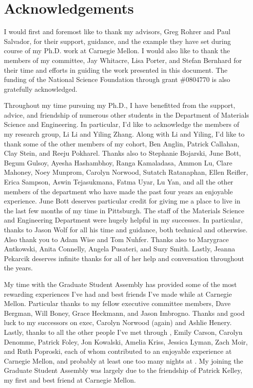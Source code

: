 \chapter{Acknowledgements}


I would first and foremost like to thank my advisors, Greg Rohrer and Paul Salvador, for
their support, guidance, and the example they have set during course of my Ph.D. work at
Carnegie Mellon. I would also like to thank the members of my committee, Jay Whitacre,
Lisa Porter, and Stefan Bernhard for their time and efforts in guiding the work presented
in this document. The funding of the National Science Foundation through grant
\#0804770 is also gratefully acknowledged.

Throughout my time pursuing my Ph.D., I have benefitted from the support, advice, and
friendship of numerous other students in the Department of Materials Science and
Engineering. In particular, I'd like to acknowledge the members of my research group, Li
Li and Yiling Zhang. Along with Li and Yiling, I'd like to thank some of the other members of my
cohort, Ben Anglin, Patrick Callahan, Clay Stein, and Reeju Pokharel. Thanks also to
Stephanie Bojarski, June Bott, Begum Gulsoy, Ayesha Hashambhoy, Ranga Kamaladasa, Ammon
Lu, Clare Mahoney, Noey Munprom, Carolyn Norwood, Sutatch Ratanaphan, Ellen Reifler, Erica
Sampson, Aswin Tejasukmana, Fatma Uyar, Lu Yan, and all the other members of the department who have made the
past four years an enjoyable experience. June Bott deserves particular credit for giving
me a place to live in the last few months of my time in Pittsburgh. The staff of the
Materials Science and Engineering Department were hugely helpful in my successes. In
particular, thanks to Jason Wolf for all his time and guidance, both technical and
otherwise. Also thank you to Adam Wise and Tom Nuhfer. Thanks also to Marygrace Antkowski,
 Anita Connelly, Angela Pusateri, and Suzy Smith. Lastly, Jeanna Pekarcik deserves
infinite thanks for all of her help and conversation throughout the years.

My time with the Graduate Student Assembly has provided some of the most rewarding
experiences I've had and best friends I've made while at Carnegie Mellon. Particular
thanks to my fellow  executive committee members, Dave Bergman, Will Boney,
Grace Heckmann, and Jason Imbrogno. Thanks and good luck to my successors on 
exec, Carolyn Norwood (again) and Ashlie Henery. Lastly, thanks to all the other people
I've met through , Emily Carson, Carolyn Denomme, Patrick Foley, Jon Kowalski,
Amelia Kriss, Jessica Lyman, Zach Moir, and Ruth Poproski, each of whom contributed to an
enjoyable experience at Carnegie Mellon, and probably at least one too many nights at
. My joining the Graduate Student Assembly was largely due to the friendship of
Patrick Kelley, my first and best friend at Carnegie Mellon. 

